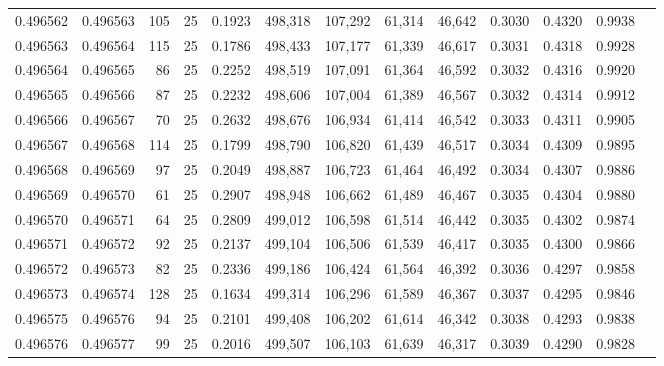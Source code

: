 \begin{tabular}{rrrrrrrrrrrrr}
0.496562 & 0.496563 &   105 &  25 &                                     0.1923 & 498,318 & 107,292 &  61,314 &  46,642 & 0.3030 & 0.4320 & 0.9938 \\
0.496563 & 0.496564 &   115 &  25 &                                     0.1786 & 498,433 & 107,177 &  61,339 &  46,617 & 0.3031 & 0.4318 & 0.9928 \\
0.496564 & 0.496565 &    86 &  25 &                                     0.2252 & 498,519 & 107,091 &  61,364 &  46,592 & 0.3032 & 0.4316 & 0.9920 \\
0.496565 & 0.496566 &    87 &  25 &                                     0.2232 & 498,606 & 107,004 &  61,389 &  46,567 & 0.3032 & 0.4314 & 0.9912 \\
0.496566 & 0.496567 &    70 &  25 &                                     0.2632 & 498,676 & 106,934 &  61,414 &  46,542 & 0.3033 & 0.4311 & 0.9905 \\
0.496567 & 0.496568 &   114 &  25 &                                     0.1799 & 498,790 & 106,820 &  61,439 &  46,517 & 0.3034 & 0.4309 & 0.9895 \\
0.496568 & 0.496569 &    97 &  25 &                                     0.2049 & 498,887 & 106,723 &  61,464 &  46,492 & 0.3034 & 0.4307 & 0.9886 \\
0.496569 & 0.496570 &    61 &  25 &                                     0.2907 & 498,948 & 106,662 &  61,489 &  46,467 & 0.3035 & 0.4304 & 0.9880 \\
0.496570 & 0.496571 &    64 &  25 &                                     0.2809 & 499,012 & 106,598 &  61,514 &  46,442 & 0.3035 & 0.4302 & 0.9874 \\
0.496571 & 0.496572 &    92 &  25 &                                     0.2137 & 499,104 & 106,506 &  61,539 &  46,417 & 0.3035 & 0.4300 & 0.9866 \\
0.496572 & 0.496573 &    82 &  25 &                                     0.2336 & 499,186 & 106,424 &  61,564 &  46,392 & 0.3036 & 0.4297 & 0.9858 \\
0.496573 & 0.496574 &   128 &  25 &                                     0.1634 & 499,314 & 106,296 &  61,589 &  46,367 & 0.3037 & 0.4295 & 0.9846 \\
0.496575 & 0.496576 &    94 &  25 &                                     0.2101 & 499,408 & 106,202 &  61,614 &  46,342 & 0.3038 & 0.4293 & 0.9838 \\
0.496576 & 0.496577 &    99 &  25 &                                     0.2016 & 499,507 & 106,103 &  61,639 &  46,317 & 0.3039 & 0.4290 & 0.9828 \\

\end{tabular}
